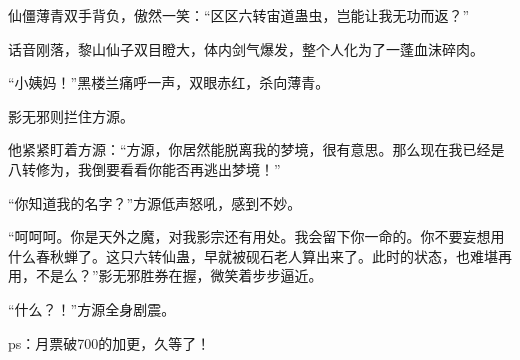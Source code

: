 \begin{this_body}
仙僵薄青双手背负，傲然一笑：“区区六转宙道蛊虫，岂能让我无功而返？”

话音刚落，黎山仙子双目瞪大，体内剑气爆发，整个人化为了一蓬血沫碎肉。

“小姨妈！”黑楼兰痛呼一声，双眼赤红，杀向薄青。

影无邪则拦住方源。

他紧紧盯着方源：“方源，你居然能脱离我的梦境，很有意思。那么现在我已经是八转修为，我倒要看看你能否再逃出梦境！”

“你知道我的名字？”方源低声怒吼，感到不妙。

“呵呵呵。你是天外之魔，对我影宗还有用处。我会留下你一命的。你不要妄想用什么春秋蝉了。这只六转仙蛊，早就被砚石老人算出来了。此时的状态，也难堪再用，不是么？”影无邪胜券在握，微笑着步步逼近。

“什么？！”方源全身剧震。

ps：月票破700的加更，久等了！

\end{this_body}

